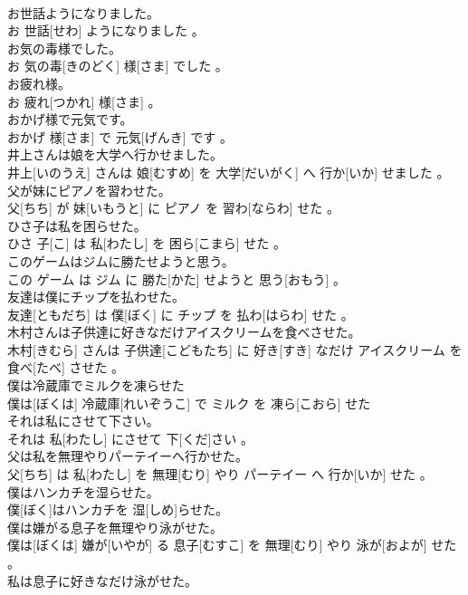 \documentclass[8pt]{extreport}
\begin{document}
\begin{CJK}{UTF8}{min}
\\	お世話ようになりました。	
\\	お 世話[せわ] ようになりました 。
\\	お気の毒様でした。	
\\	お 気の毒[きのどく] 様[さま] でした 。
\\	お疲れ様。	
\\	お 疲れ[つかれ] 様[さま] 。
\\	おかげ様で元気です。	
\\	おかげ 様[さま] で 元気[げんき] です 。
\\	井上さんは娘を大学へ行かせました。	
\\	井上[いのうえ] さんは 娘[むすめ] を 大学[だいがく] へ 行か[いか] せました 。
\\	父が妹にピアノを習わせた。	
\\	父[ちち] が 妹[いもうと] に ピアノ を 習わ[ならわ] せた 。
\\	ひさ子は私を困らせた。	
\\	ひさ 子[こ] は 私[わたし] を 困ら[こまら] せた 。
\\	このゲームはジムに勝たせようと思う。	
\\	この ゲーム は ジム に 勝た[かた] せようと 思う[おもう] 。
\\	友達は僕にチップを払わせた。	
\\	友達[ともだち] は 僕[ぼく] に チップ を 払わ[はらわ] せた 。
\\	木村さんは子供達に好きなだけアイスクリームを食べさせた。	
\\	木村[きむら] さんは 子供達[こどもたち] に 好き[すき] なだけ アイスクリーム を 食べ[たべ] させた 。
\\	僕は冷蔵庫でミルクを凍らせた	
\\	僕は[ぼくは] 冷蔵庫[れいぞうこ] で ミルク を 凍ら[こおら] せた
\\	それは私にさせて下さい。	
\\	それは 私[わたし] にさせて 下[くだ]さい 。
\\	父は私を無理やりパーテイーへ行かせた。	
\\	父[ちち] は 私[わたし] を 無理[むり] やり パーテイー へ 行か[いか] せた 。
\\	僕はハンカチを湿らせた。	
\\	僕[ぼく]はハンカチを 湿[しめ]らせた。
\\	僕は嫌がる息子を無理やり泳がせた。	
\\	僕は[ぼくは] 嫌が[いやが] る 息子[むすこ] を 無理[むり] やり 泳が[およが] せた 。
\\	私は息子に好きなだけ泳がせた。	

\end{CJK}
\end{document}
